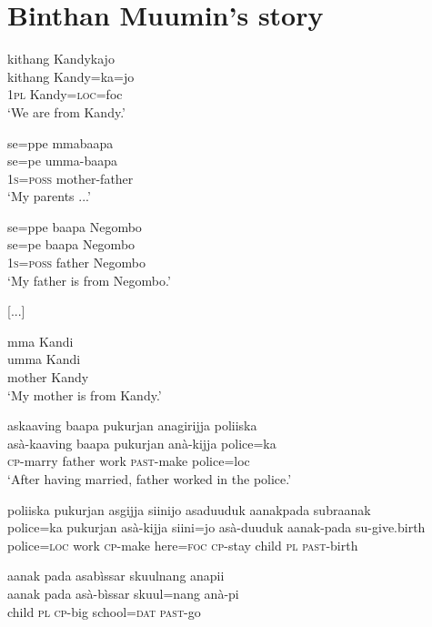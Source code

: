 \section{Binthan Muumin's story}
\ea \label{K051222nar04.6}
\glll
 kithang Kandykajo\\
 kithang  Kandy=ka=jo\\
 \textsc{1pl} Kandy=\textsc{loc}=foc\\
 `We are from Kandy.'
\z


\ea \label{K051222nar04.7}
\glll
 se=ppe mmabaapa\\
 se=pe umma-baapa\\
 \textsc{1s=poss} mother-father\\
 `My parents ...'
\z


\ea \label{K051222nar04.8}
\glll
 se=ppe baapa Negombo\\
 se=pe baapa Negombo\\
 \textsc{1s=poss} father Negombo\\
 `My father is from Negombo.'
\z

[...]

\ea \label{K051222nar04.13}
\glll
 mma Kandi\\
 umma Kandi\\
 mother Kandy\\
`My mother is from Kandy.'
\z


\ea \label{K051222nar04.14}
\glll
 askaaving baapa pukurjan anagirijja poliiska\\
 asà-kaaving baapa pukurjan anà-kijja police=ka\\
 \textsc{cp}-marry father work \textsc{past}-make police=loc\\
 `After having married, father worked in the police.'
\z


\ea \label{K051222nar04.15}
\glll
 poliiska pukurjan asgijja siinijo asaduuduk   aanakpada subraanak\\
 police=ka pukurjan asà-kijja siini=jo asà-duuduk aanak-pada su-give.birth\\
 police=\textsc{loc} work \textsc{cp}-make here=\textsc{foc} \textsc{cp}-stay  child \textsc{pl} \textsc{past}-birth\\
\z

\ea \label{K051222nar04.17}
\glll
 aanak pada asabìssar skuulnang anapii\\
 aanak pada asà-bìssar skuul=nang anà-pi\\
 child  \textsc{pl} \textsc{cp}-big    school=\textsc{dat} \textsc{past}-go\\
\z



